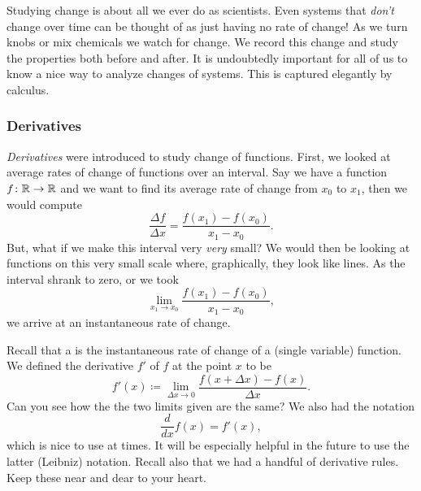     Studying change is about all we ever do as scientists.  Even systems that \emph{don't} change over time can be thought of as just having no rate of change! As we turn knobs or mix chemicals we watch for change. We record this change and study the properties both before and after.  It is undoubtedly important for all of us to know a nice way to analyze changes of systems. This is captured elegantly by calculus.
    
    \subsubsection{Derivatives}
    \emph{Derivatives} were introduced to study change of functions.  First, we looked at average rates of change of functions over an interval.  Say we have a function $f\colon \mathbb{R} \to \mathbb{R}$ and we want to find its average rate of change from $x_0$ to $x_1$, then we would compute
    \[
    \frac{\Delta f}{\Delta x} = \frac{f(x_1)-f(x_0)}{x_1-x_0}.
    \]
    But, what if we make this interval very \emph{very} small?  We would then be looking at functions on this very small scale where, graphically, they look like lines. As the interval shrank to zero, or we took
    \[
    \lim_{x_1 \to x_0} \frac{f(x_1)-f(x_0)}{x_1-x_0},
    \]
    we arrive at an instantaneous rate of change.
    
    Recall that a  is the instantaneous rate of change of a (single variable) function. We defined the derivative $f'$ of $f$ at the point $x$ to be
    \[
    f'(x)\coloneqq\lim_{\Delta x \to 0} \frac{f(x+\Delta x)-f(x)}{\Delta x}.
    \]
    Can you see how the the two limits given are the same? We also had the notation
    \[
    \frac{d}{dx}f(x)=f'(x),
    \]
    which is nice to use at times. It will be especially helpful in the future to use the latter (Leibniz) notation.  Recall also that we had a handful of derivative rules.  Keep these near and dear to your heart.
    
